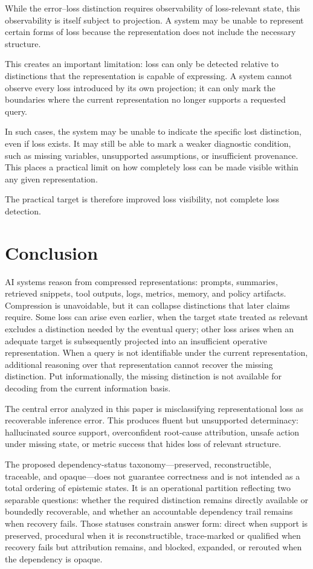 \documentclass[11pt]{article}
\begin{document}
While the error--loss distinction requires observability of loss-relevant state, this observability is itself subject to projection. A system may be unable to represent certain forms of loss because the representation does not include the necessary structure.

This creates an important limitation: loss can only be detected relative to distinctions that the representation is capable of expressing. A system cannot observe every loss introduced by its own projection; it can only mark the boundaries where the current representation no longer supports a requested query.

In such cases, the system may be unable to indicate the specific lost distinction, even if loss exists. It may still be able to mark a weaker diagnostic condition, such as missing variables, unsupported assumptions, or insufficient provenance. This places a practical limit on how completely loss can be made visible within any given representation.

The practical target is therefore improved loss visibility, not complete loss detection.

\section{Conclusion}

AI systems reason from compressed representations: prompts, summaries, retrieved snippets, tool outputs, logs, metrics, memory, and policy artifacts. Compression is unavoidable, but it can collapse distinctions that later claims require. Some loss can arise even earlier, when the target state treated as relevant excludes a distinction needed by the eventual query; other loss arises when an adequate target is subsequently projected into an insufficient operative representation. When a query is not identifiable under the current representation, additional reasoning over that representation cannot recover the missing distinction. Put informationally, the missing distinction is not available for decoding from the current information basis.

The central error analyzed in this paper is misclassifying representational loss as recoverable inference error. This produces fluent but unsupported determinacy: hallucinated source support, overconfident root-cause attribution, unsafe action under missing state, or metric success that hides loss of relevant structure.

The proposed dependency-status taxonomy---preserved, reconstructible, traceable, and opaque---does not guarantee correctness and is not intended as a total ordering of epistemic states. It is an operational partition reflecting two separable questions: whether the required distinction remains directly available or boundedly recoverable, and whether an accountable dependency trail remains when recovery fails. Those statuses constrain answer form: direct when support is preserved, procedural when it is reconstructible, trace-marked or qualified when recovery fails but attribution remains, and blocked, expanded, or rerouted when the dependency is opaque.
\end{document}
